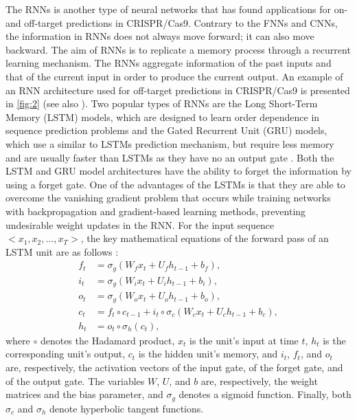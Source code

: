 \documentclass[unnumsec,webpdf,contemporary,large]{oup-authoring-template}
\theoremstyle{thmstyleone}%
\theoremstyle{thmstyletwo}%
\theoremstyle{thmstylethree}%
\begin{document}
The RNNs is another type of neural networks that has found applications for on- and off-target predictions in CRISPR/Cas9. Contrary to the FNNs and CNNs, the information in RNNs does not always move forward; it can also move backward. The aim of RNNs is to replicate a memory process through a recurrent learning mechanism. The RNNs aggregate information of the past inputs and that of the current input in order to produce the current output. An example of an RNN architecture used for off-target predictions in CRISPR/Cas9 is presented in \ref{fig:2} (see also \citep{charlier2021accurate}). Two popular types of RNNs are the Long Short-Term Memory (LSTM) models, which are designed to learn order dependence in sequence prediction problems \cite{hochreiter1997long, gers2000learning} and the Gated Recurrent Unit (GRU) models, which use a similar to LSTMs prediction mechanism, but require less memory and are usually faster than LSTMs as they have no an output gate \cite{chung2014empirical}. Both the LSTM and GRU model architectures have the ability to forget the information by using a forget gate. One of the advantages of the LSTMs is that they are able to overcome the vanishing gradient problem that occurs while training networks with backpropagation and gradient-based learning methods, preventing undesirable weight updates in the RNN. For the input sequence $<x_1, x_2, …, x_T>$, the key mathematical equations of the forward pass of an LSTM unit are as follows \cite{heaton2018ian}:
\begin{align}
f_t &= \sigma_g (W_f x_t + U_f h_{t-1}+b_f),\\\nonumber
i_t &= \sigma_g (W_i x_t + U_i h_{t-1}+b_i),\\\nonumber
o_t &= \sigma_g (W_o x_t + U_o h_{t-1}+b_o),\\\nonumber
c_t &= f_t  \circ c_{t-1} + i_t  \circ \sigma_c (W_c x_t + U_c h_{t-1}+b_c),\\\nonumber
h_t &= o_t \circ \sigma_h (c_t),
\end{align}
where $\circ$ denotes the Hadamard product, $x_t$ is the unit's input at time $t$, $h_t$ is the corresponding unit's output, $c_t$ is the hidden unit's memory, and $i_t$, $f_t$, and $o_t$ are, respectively, the activation vectors of the input gate, of the forget gate, and of the output gate. The variables $W$, $U$, and $b$ are, respectively, the weight matrices and the bias parameter, and $\sigma_g$ denotes a sigmoid function. Finally, both $\sigma_c$ and $\sigma_h$ denote hyperbolic tangent functions.\\
\end{document}
